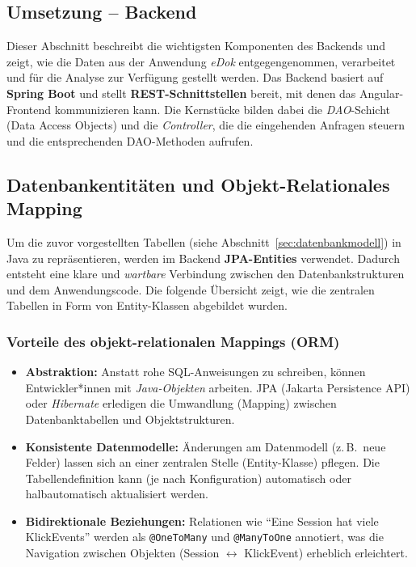 \documentclass[12pt,oneside]{article}
\begin{document}
\subsection{Umsetzung -- Backend}
\label{sec:umsetzung_backend}

Dieser Abschnitt beschreibt die wichtigsten Komponenten des Backends und zeigt, wie die Daten aus der Anwendung \textit{eDok} entgegengenommen, verarbeitet und für die Analyse zur Verfügung gestellt werden. Das Backend basiert auf \textbf{Spring Boot} und stellt \textbf{REST-Schnittstellen} bereit, mit denen das Angular-Frontend kommunizieren kann. Die Kernstücke bilden dabei die \emph{DAO}-Schicht (Data Access Objects) und die \emph{Controller}, die die eingehenden Anfragen steuern und die entsprechenden DAO-Methoden aufrufen.
\subsection{Datenbankentitäten und Objekt-Relationales Mapping}
\label{subsec:entities_orm}

Um die zuvor vorgestellten Tabellen (siehe Abschnitt~\ref{sec:datenbankmodell}) in Java zu repräsentieren, werden im Backend \textbf{JPA-Entities} verwendet. Dadurch entsteht eine klare und \emph{wartbare} Verbindung zwischen den Datenbankstrukturen und dem Anwendungscode. Die folgende Übersicht zeigt, wie die zentralen Tabellen in Form von Entity-Klassen abgebildet wurden.

\subsubsection{Vorteile des objekt-relationalen Mappings (ORM)}
\begin{itemize}
    \item \textbf{Abstraktion:} Anstatt rohe SQL-Anweisungen zu schreiben, können Entwickler*innen mit \emph{Java-Objekten} arbeiten. JPA (Jakarta Persistence API) oder \emph{Hibernate} erledigen die Umwandlung (Mapping) zwischen Datenbanktabellen und Objektstrukturen.
    \item \textbf{Konsistente Datenmodelle:} Änderungen am Datenmodell (z.\,B.\ neue Felder) lassen sich an einer zentralen Stelle (Entity-Klasse) pflegen. Die Tabellendefinition kann (je nach Konfiguration) automatisch oder halbautomatisch aktualisiert werden.
    \item \textbf{Bidirektionale Beziehungen:} Relationen wie \enquote{Eine Session hat viele KlickEvents} werden als \lstinline|@OneToMany| und \lstinline|@ManyToOne| annotiert, was die Navigation zwischen Objekten (Session $\leftrightarrow$ KlickEvent) erheblich erleichtert.
\end{itemize}
\end{document}
